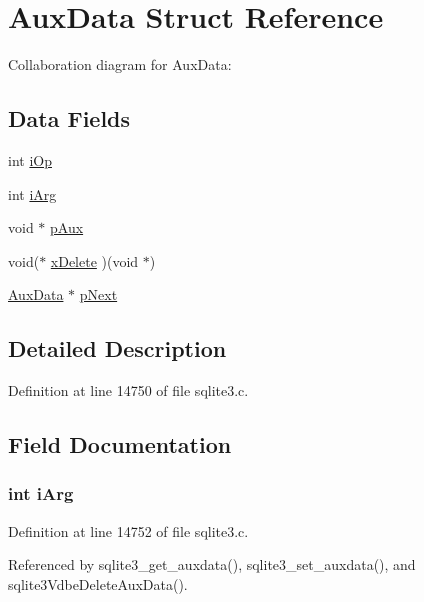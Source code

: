 \hypertarget{struct_aux_data}{}\section{Aux\+Data Struct Reference}
\label{struct_aux_data}


Collaboration diagram for Aux\+Data\+:
\subsection*{Data Fields}
\begin{DoxyCompactItemize}
\item 
int \hyperlink{struct_aux_data_a7d4638420dcef0fb9e0120bad40857e3}{i\+Op}
\item 
int \hyperlink{struct_aux_data_a085bbd9e92a1873509f3a3905b368a4c}{i\+Arg}
\item 
void $\ast$ \hyperlink{struct_aux_data_aae735e24d027e9a5d3e39ab9de5c166b}{p\+Aux}
\item 
void($\ast$ \hyperlink{struct_aux_data_af8a71a795985052cc4c2eab5985f8551}{x\+Delete} )(void $\ast$)
\item 
\hyperlink{struct_aux_data}{Aux\+Data} $\ast$ \hyperlink{struct_aux_data_a1b254db36b3e616c8152d0d0546750a0}{p\+Next}
\end{DoxyCompactItemize}


\subsection{Detailed Description}


Definition at line 14750 of file sqlite3.\+c.



\subsection{Field Documentation}
\hypertarget{struct_aux_data_a085bbd9e92a1873509f3a3905b368a4c}{}
\subsubsection[{i\+Arg}]{\setlength{\rightskip}{0pt plus 5cm}int i\+Arg}\label{struct_aux_data_a085bbd9e92a1873509f3a3905b368a4c}


Definition at line 14752 of file sqlite3.\+c.



Referenced by sqlite3\+\_\+get\+\_\+auxdata(), sqlite3\+\_\+set\+\_\+auxdata(), and sqlite3\+Vdbe\+Delete\+Aux\+Data().

